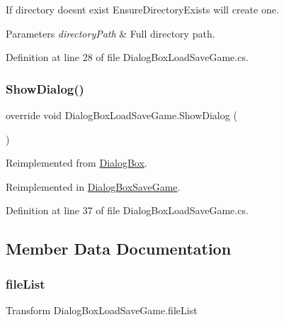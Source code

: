 If directory doesn\textquotesingle{}t exist Ensure\+Directory\+Exists will create one. 


\begin{DoxyParams}{Parameters}
{\em directory\+Path} & Full directory path.\\
\hline
\end{DoxyParams}


Definition at line 28 of file Dialog\+Box\+Load\+Save\+Game.\+cs.

\mbox{\label{class_dialog_box_load_save_game_ae44957b0dcc55696639d534c04574c57}} 
\subsubsection{\texorpdfstring{Show\+Dialog()}{ShowDialog()}}
{\footnotesize\ttfamily override void Dialog\+Box\+Load\+Save\+Game.\+Show\+Dialog (\begin{DoxyParamCaption}{ }\end{DoxyParamCaption})\hspace{0.3cm}{\ttfamily [virtual]}}



Reimplemented from \hyperlink{class_dialog_box_a971a6e45f6ca26863c3910680521b0ac}{Dialog\+Box}.



Reimplemented in \hyperlink{class_dialog_box_save_game_a83ed557d75cb749de3b8e3a6b60e1c3d}{Dialog\+Box\+Save\+Game}.



Definition at line 37 of file Dialog\+Box\+Load\+Save\+Game.\+cs.



\subsection{Member Data Documentation}
\mbox{\label{class_dialog_box_load_save_game_ad75e9a340ab87784f8d4ba5787a9c675}} 
\subsubsection{\texorpdfstring{file\+List}{fileList}}
{\footnotesize\ttfamily Transform Dialog\+Box\+Load\+Save\+Game.\+file\+List}



